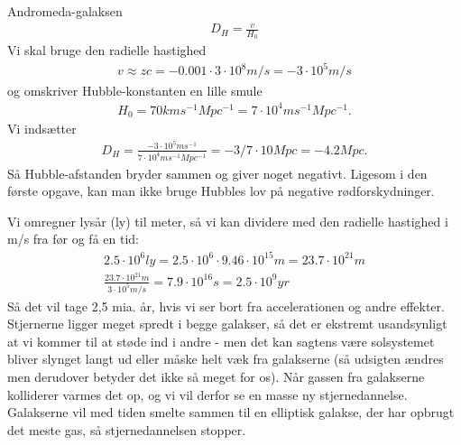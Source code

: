 \begin{opgave}{Andromeda-galaksen}
	\opg 
	\begin{align}
		D_H=\frac{v}{H_0} 
	\end{align}
	Vi skal bruge den radielle hastighed
	\begin{align}
		v \approx z c = -0.001 \cdot 3\cdot 10^8 m/s =-3\cdot 10^5 m/s
	\end{align}
	og omskriver Hubble-konstanten en lille smule
	\begin{align}
		H_0=70 km s^{-1} Mpc^{-1} = 7 \cdot 10^4 m s^{-1} Mpc^{-1}.
	\end{align}
	Vi indsætter
	\begin{align}
	D_H=\frac{-3\cdot 10^5 m s^{-1}} {7 \cdot 10^4 m s^{-1} Mpc^{-1}} = - 3/7 \cdot 10 Mpc = - 4.2 Mpc.
	\end{align}
	Så Hubble-afstanden bryder sammen og giver noget negativt. Ligesom i den første opgave, kan man ikke bruge Hubbles lov på negative rødforskydninger.
	
	\opg Vi omregner lysår (ly) til meter, så vi kan dividere med den radielle hastighed i m/s fra før og få en tid:
	\begin{align}
		2.5\cdot 10^6 ly = 2.5\cdot 10^6 \cdot 9.46 \cdot 10^{15} m = 23.7 \cdot 10^{21} m\\
		\frac{23.7 \cdot 10^{21} m}{3\cdot 10^5 m/s} = 7.9 \cdot 10^{16} s = 2.5 \cdot 10^9 yr
	\end{align} 
	Så det vil tage 2,5 mia. år, hvis vi ser bort fra accelerationen og andre effekter.
	Stjernerne ligger meget spredt i begge galakser, så det er ekstremt usandsynligt at vi kommer til at støde ind i andre - men det kan sagtens være solsystemet bliver slynget langt ud eller måske helt væk fra galakserne (så udsigten ændres men derudover betyder det ikke så meget for os). Når gassen fra galakserne kolliderer varmes det op, og vi vil derfor se en masse ny stjernedannelse. Galakserne vil med tiden smelte sammen til en elliptisk galakse, der har opbrugt det meste gas, så stjernedannelsen stopper.
\end{opgave}